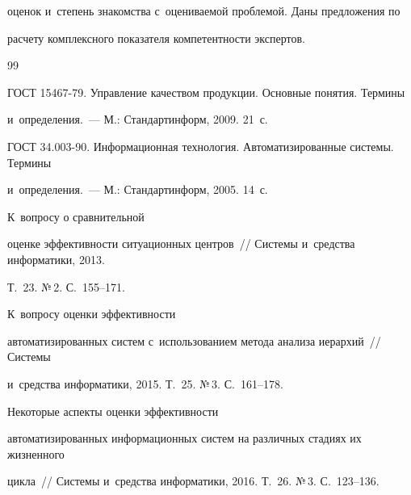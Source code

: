 оценок и~степень знакомства с~оцениваемой проблемой. Даны предложения по 

расчету комплексного показателя компетентности экспертов.



\vspace*{-4pt}



{\small\frenchspacing

{%


\begin{thebibliography}{99}



\vspace*{-1pt}




ГОСТ 15467-79. Управление качеством продукции. Основные понятия. Термины 

и~определения.~--- М.: Стандартинформ, 2009. 21~с.




ГОСТ 34.003-90. Информационная технология. Автоматизированные системы. Термины 

и~определения.~--- М.: Стандартинформ, 2005. 14~с.




 К~вопросу о сравнительной 

оценке эффективности ситуационных центров~/\!\!/ Системы и~средства информатики, 2013. 

Т.~23. №\,2. С.~155--171.


 К~вопросу оценки эффективности 

автоматизированных систем с~использованием метода анализа иерархий~/\!\!/ Системы 

и~средства информатики, 2015. Т.~25. №\,3. С.~161--178.


 Некоторые аспекты оценки эффективности 

автоматизированных информационных систем на различных стадиях их жизненного 

цикла~/\!\!/ Системы и~средства информатики, 2016. Т.~26. №\,3. С.~123--136.


\end{thebibliography}}}
